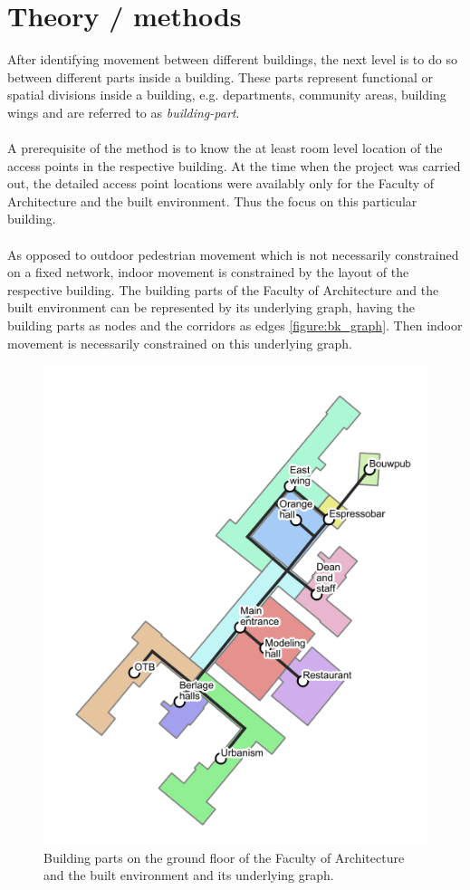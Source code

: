 \section{Theory / methods}\label{11methods}
After identifying movement between different buildings, the next level is to do so between different parts inside a building. These parts represent
functional or spatial divisions inside a building, e.g. departments, community areas, building wings and are referred to as \textit{building-part}.\\\\
A prerequisite of the method is to know the at least room level location of the access points in the respective building. At the time when the project
was carried out, the detailed access point locations were availably only for the Faculty of Architecture and the built environment. Thus the focus on this particular building.\\\\
As opposed to outdoor pedestrian movement which is not necessarily constrained on a fixed network, indoor movement is constrained by the layout of the
respective building. The building parts of the Faculty of Architecture and the built environment can be represented by its underlying graph, having the building parts as nodes and the corridors as edges \autoref{figure:bk_graph}. Then indoor movement is necessarily constrained on this underlying graph.

\begin{figure}[H]
\centering
\includegraphics[scale=0.5]{bk_BG_bparts.png}
\captionsetup{justification=centering}
\caption{Building parts on the ground floor of the Faculty of Architecture and the built environment and
its underlying graph.}
\label{figure:bk_graph}
\end{figure}

